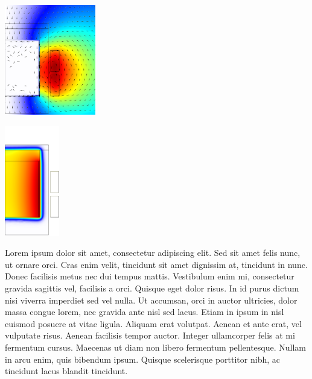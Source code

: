 \documentclass[portrait, a1paper, fontscale=0.5]{baposter}
\begin{document}
\begin{poster}
{\begin{center}
	\begin{minipage}{10em}
		\centering
		\includegraphics[height=13em]{optimization/magnetic_field.png}
	\end{minipage}
	\begin{minipage}{10em}
		\centering
		\includegraphics[height=13em]{optimization/temperature_field.png}
	\end{minipage}
	\begin{minipage}{30em}
		Lorem ipsum dolor sit amet, consectetur adipiscing elit. Sed sit amet felis nunc, ut ornare orci. Cras enim velit, tincidunt sit amet dignissim at, tincidunt in nunc. Donec facilisis metus nec dui tempus mattis. Vestibulum enim mi, consectetur gravida sagittis vel, facilisis a orci. Quisque eget dolor risus. In id purus dictum nisi viverra imperdiet sed vel nulla. Ut accumsan, orci in auctor ultricies, dolor massa congue lorem, nec gravida ante nisl sed lacus. Etiam in ipsum in nisl euismod posuere at vitae ligula. Aliquam erat volutpat. Aenean et ante erat, vel vulputate risus. Aenean facilisis tempor auctor. Integer ullamcorper felis at mi fermentum cursus. Maecenas ut diam non libero fermentum pellentesque. Nullam in arcu enim, quis bibendum ipsum. Quisque scelerisque porttitor nibh, ac tincidunt lacus blandit tincidunt.
	\end{minipage}
\end{center}

}
\end{poster}
\end{document}
